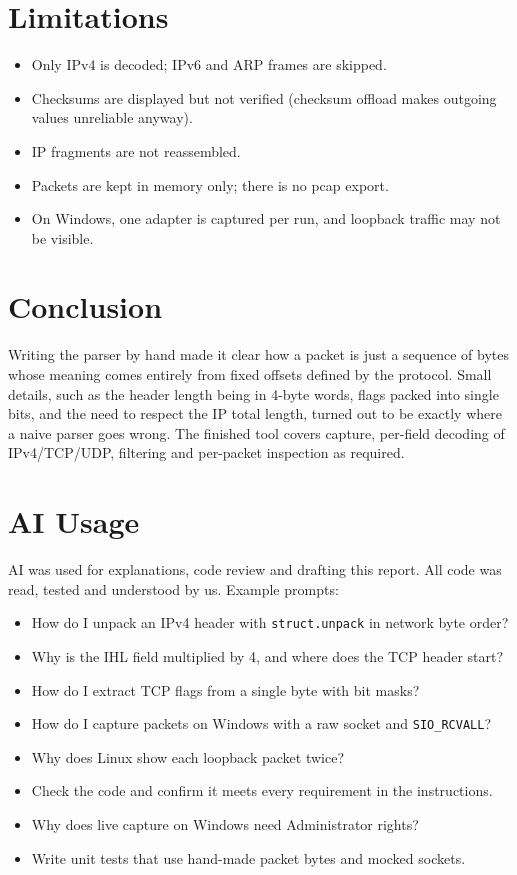 \documentclass[11pt,a4paper]{article}
\begin{document}
\section{Limitations}

\begin{itemize}
  \item Only IPv4 is decoded; IPv6 and ARP frames are skipped.
  \item Checksums are displayed but not verified (checksum offload makes
  outgoing values unreliable anyway).
  \item IP fragments are not reassembled.
  \item Packets are kept in memory only; there is no pcap export.
  \item On Windows, one adapter is captured per run, and loopback traffic may
  not be visible.
\end{itemize}

\section{Conclusion}

Writing the parser by hand made it clear how a packet is just a sequence of
bytes whose meaning comes entirely from fixed offsets defined by the protocol.
Small details, such as the header length being in 4-byte words, flags packed
into single bits, and the need to respect the IP total length, turned out to be
exactly where a naive parser goes wrong. The finished tool covers capture,
per-field decoding of IPv4/TCP/UDP, filtering and per-packet inspection as
required.

\section{AI Usage}
AI was used for explanations, code review and drafting this report. All code was read, tested and understood by us. Example prompts:
\begin{itemize}
  \item How do I unpack an IPv4 header with \texttt{struct.unpack} in network byte order?
  \item Why is the IHL field multiplied by 4, and where does the TCP header start?
  \item How do I extract TCP flags from a single byte with bit masks?
  \item How do I capture packets on Windows with a raw socket and \texttt{SIO\_RCVALL}?
  \item Why does Linux show each loopback packet twice?
  \item Check the code and confirm it meets every requirement in the instructions.
  \item Why does live capture on Windows need Administrator rights?
  \item Write unit tests that use hand-made packet bytes and mocked sockets.
\end{itemize}
\end{document}
